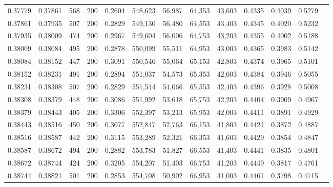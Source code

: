 \begin{tabular}{rrrrrrrrrrrrr}
0.37779 & 0.37861 &    568 & 200 &                                     0.2604 & 548,623 &  56,987 &  64,353 &  43,603 & 0.4335 & 0.4039 & 0.5279 \\
0.37861 & 0.37935 &    507 & 200 &                                     0.2829 & 549,130 &  56,480 &  64,553 &  43,403 & 0.4345 & 0.4020 & 0.5232 \\
0.37935 & 0.38009 &    474 & 200 &                                     0.2967 & 549,604 &  56,006 &  64,753 &  43,203 & 0.4355 & 0.4002 & 0.5188 \\
0.38009 & 0.38084 &    495 & 200 &                                     0.2878 & 550,099 &  55,511 &  64,953 &  43,003 & 0.4365 & 0.3983 & 0.5142 \\
0.38084 & 0.38152 &    447 & 200 &                                     0.3091 & 550,546 &  55,064 &  65,153 &  42,803 & 0.4374 & 0.3965 & 0.5101 \\
0.38152 & 0.38231 &    491 & 200 &                                     0.2894 & 551,037 &  54,573 &  65,353 &  42,603 & 0.4384 & 0.3946 & 0.5055 \\
0.38231 & 0.38308 &    507 & 200 &                                     0.2829 & 551,544 &  54,066 &  65,553 &  42,403 & 0.4396 & 0.3928 & 0.5008 \\
0.38308 & 0.38379 &    448 & 200 &                                     0.3086 & 551,992 &  53,618 &  65,753 &  42,203 & 0.4404 & 0.3909 & 0.4967 \\
0.38379 & 0.38443 &    405 & 200 &                                     0.3306 & 552,397 &  53,213 &  65,953 &  42,003 & 0.4411 & 0.3891 & 0.4929 \\
0.38443 & 0.38516 &    450 & 200 &                                     0.3077 & 552,847 &  52,763 &  66,153 &  41,803 & 0.4421 & 0.3872 & 0.4887 \\
0.38516 & 0.38587 &    442 & 200 &                                     0.3115 & 553,289 &  52,321 &  66,353 &  41,603 & 0.4429 & 0.3854 & 0.4847 \\
0.38587 & 0.38672 &    494 & 200 &                                     0.2882 & 553,783 &  51,827 &  66,553 &  41,403 & 0.4441 & 0.3835 & 0.4801 \\
0.38672 & 0.38744 &    424 & 200 &                                     0.3205 & 554,207 &  51,403 &  66,753 &  41,203 & 0.4449 & 0.3817 & 0.4761 \\
0.38744 & 0.38821 &    501 & 200 &                                     0.2853 & 554,708 &  50,902 &  66,953 &  41,003 & 0.4461 & 0.3798 & 0.4715 \\

\end{tabular}
